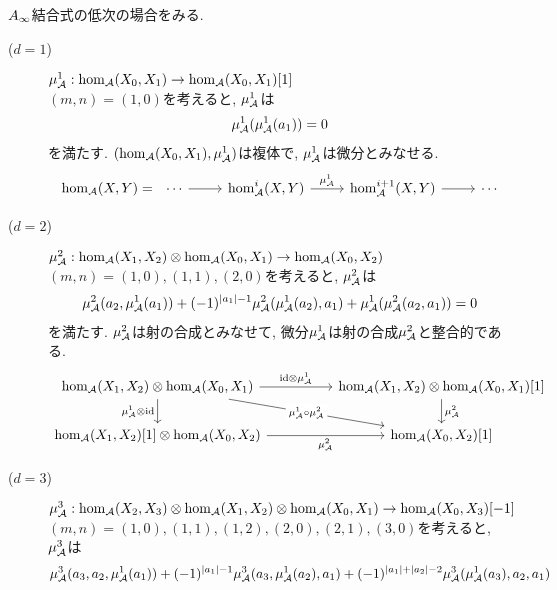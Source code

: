 \documentclass[uplatex, a4paper, 14Q, dvipdfmx]{jsarticle}
\begin{document}
\begin{remark} \label{rem_low_Ainf_associativity}
  $A_{\infty}$結合式の低次の場合をみる. 
  \begin{description}
    \item[($d=1$)] $\mu^1_{\mathcal{A}} : \hom_{\mathcal{A}}(X_0,X_1) \to \hom_{\mathcal{A}}(X_0,X_1)[1]$ \\
    $(m,n) = (1,0)$を考えると, $\mu^1_{\mathcal{A}}$は
    \begin{align*}
      \mu^1_{\mathcal{A}} (\mu^1_{\mathcal{A}} (a_1))
      = 0
    \end{align*}
    を満たす. 
    $(\hom_{\mathcal{A}}(X_0,X_1), \mu^1_{\mathcal{A}})$は複体で, $\mu^1_{\mathcal{A}}$は微分とみなせる. 
    \[\begin{tikzcd}
      {\hom_\A(X,Y) = ~~ \cdots} & {\hom^i_\A(X,Y)} & {\hom^{i+1}_\A(X,Y)} & \cdots
      \arrow[from=1-1, to=1-2]
      \arrow["{\mu^1_\A}", from=1-2, to=1-3]
      \arrow[from=1-3, to=1-4]
    \end{tikzcd}\]
    \item[($d=2$)] $\mu^2_{\mathcal{A}} : \hom_{\mathcal{A}}(X_1,X_2) \otimes \hom_{\mathcal{A}}(X_0,X_1) \to \hom_{\mathcal{A}}(X_0,X_2)$ \\
    $(m,n) = (1,0), (1,1), (2,0)$を考えると, $\mu^2_{\mathcal{A}}$は 
    \begin{align*}
      \mu^2_{\mathcal{A}}(a_2, \mu^1_{\mathcal{A}}(a_1)) + (-1)^{|a_1|-1} \mu^2_{\mathcal{A}}(\mu^1_{\mathcal{A}}(a_2), a_1) + \mu^1_{\mathcal{A}}(\mu^2_{\mathcal{A}}(a_2, a_1))
      = 0
    \end{align*}
    を満たす. 
    $\mu^2_{\mathcal{A}}$は射の合成とみなせて, 微分$\mu^1_{\mathcal{A}}$は射の合成$\mu^2_{\mathcal{A}}$と整合的である. 
    \[\begin{tikzcd}
      {\hom_\A(X_1,X_2) \otimes \hom_\A(X_0,X_1)} && {\hom_\A(X_1,X_2) \otimes \hom_\A(X_0,X_1)[1]} \\
      {\hom_\A(X_1,X_2)[1] \otimes \hom_\A(X_0,X_2)} && {\hom_\A(X_0,X_2)[1]}
      \arrow["{\id \otimes \mu^1_\A}", from=1-1, to=1-3]
      \arrow["{\mu^2_\A}", from=1-3, to=2-3]
      \arrow["{\mu^1_\A \otimes \id}"', from=1-1, to=2-1]
      \arrow["{\mu^2_\A}"', from=2-1, to=2-3]
      \arrow["{\mu^1_\A \circ \mu^2_\A}"{description}, from=1-1, to=2-3]
    \end{tikzcd}\]
    \item[($d=3$)] $\mu^3_{\mathcal{A}} : \hom_{\mathcal{A}}(X_2,X_3) \otimes \hom_{\mathcal{A}}(X_1,X_2) \otimes \hom_{\mathcal{A}}(X_0,X_1) \to \hom_{\mathcal{A}}(X_0,X_3)[-1]$ \\
    $(m,n) = (1,0), (1,1), (1,2), (2,0), (2,1), (3,0)$を考えると, $\mu^3_{\mathcal{A}}$は
    \begin{align*}
      &\mu^3_\A(a_3, a_2, \mu^1_\A(a_1)) + (-1)^{|a_1|-1} \mu^3_\A(a_3, \mu^1_\A(a_2), a_1) + (-1)^{|a_1|+|a_2|-2} \mu^3_\A(\mu^1_\A(a_3), a_2, a_1) \\

\end{align*}
\end{description}
\end{remark}
\end{document}
